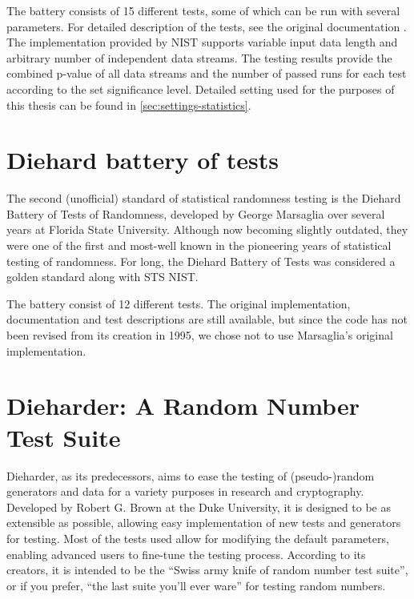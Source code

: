 \documentclass[12pt,oneside]{fithesis2}
\begin{document}
The battery consists of 15 different tests, some of which can be run with several parameters. 
For detailed description of the tests, see the original documentation \parencite{sts-nist-documentation}. 
The implementation provided by NIST supports variable input data length and arbitrary number of independent data streams. 
The testing results provide the combined p-value of all data streams and the number of passed runs for each test 
according to the set significance level. 
Detailed setting used for the purposes of this thesis can be found in \autoref{sec:settings-statistics}.

\section{Diehard battery of tests}
\label{sec:diehard}

The second (unofficial) standard of statistical randomness testing is the Diehard Battery of Tests of Randomness, 
developed by George Marsaglia over several years at Florida State University. \parencite{diehard} 
Although now becoming slightly outdated, they were one of the first and most-well known 
in the pioneering years of statistical testing of randomness. 
For long, the Diehard Battery of Tests was considered a golden standard along with STS NIST.

The battery consist of 12 different tests. The original implementation, documentation and test descriptions are still available,
but since the code has not been revised from its creation in 1995, we chose not to use Marsaglia's original implementation.

\section{Dieharder: A Random Number Test Suite}
\label{sec:dieharder}

Dieharder, as its predecessors, aims to ease the testing of (pseudo-)random generators and data for a variety purposes in research 
and cryptography. Developed by Robert G. Brown at the Duke University, it is designed to be as extensible as possible, 
allowing easy implementation of new tests and generators for testing. Most of the tests used allow for 
modifying the default parameters, enabling advanced users to fine-tune the testing process.
According to its creators, it is intended to be the ``Swiss army knife of random number test suite'', 
or if you prefer, ``the last suite you'll ever ware'' for testing random numbers. \parencite{dieharder}
\end{document}
